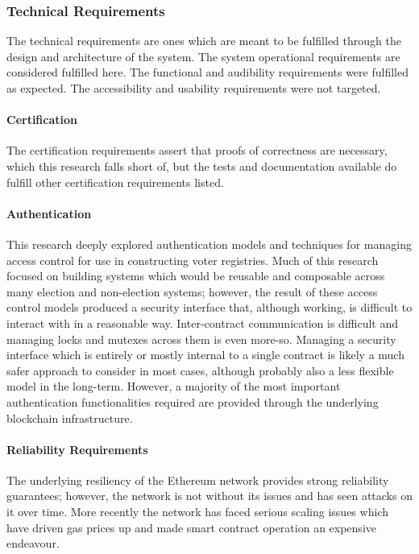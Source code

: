 \subsubsection{Technical Requirements}
The technical requirements are ones which are meant to be fulfilled through the
design and architecture of the system. The system operational requirements are
considered fulfilled here. The functional and audibility requirements were
fulfilled as expected. The accessibility and usability requirements were not
targeted.

\paragraph{Certification}
The certification requirements assert that proofs of correctness are necessary,
which this research falls short of, but the tests and documentation available do
fulfill other certification requirements listed.

\paragraph{Authentication}
This research deeply explored authentication models and techniques for managing
access control for use in constructing voter registries. Much of this research
focused on building systems which would be reusable and composable across many
election and non-election systems; however, the result of these access control
models produced a security interface that, although working, is difficult to
interact with in a reasonable way. Inter-contract communication is difficult and
managing locks and mutexes across them is even more-so. Managing a security
interface which is entirely or mostly internal to a single contract is likely a
much safer approach to consider in most cases, although probably also a less
flexible model in the long-term. However, a majority of the most important
authentication functionalities required are provided through the underlying
blockchain infrastructure.

\paragraph{Reliability Requirements}
The underlying resiliency of the Ethereum network provides strong reliability
guarantees; however, the network is not without its issues and has seen attacks
on it over time. More recently the network has faced serious scaling issues
which have driven gas prices up and made smart contract operation an expensive
endeavour.

